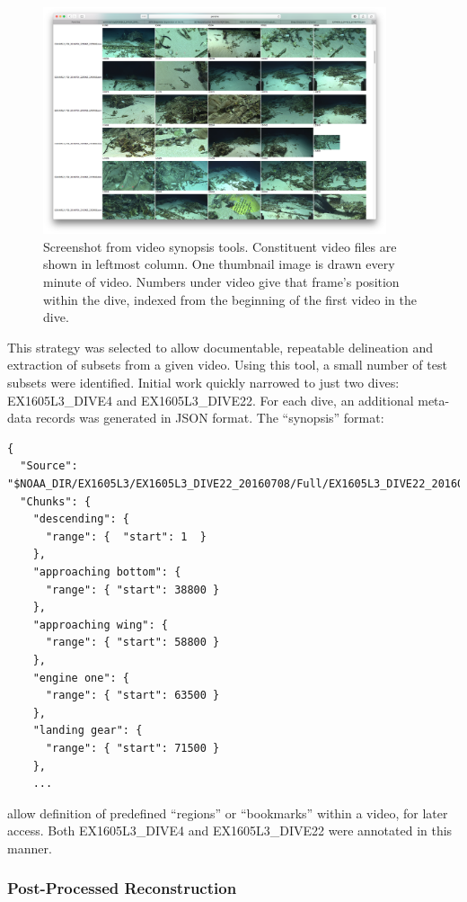 \documentclass[letterpaper,12pt]{article}
\begin{document}
\begin{figure}
    \centering
    \includegraphics[width=0.9\textwidth]{images/thumbnailer_screenshot.png}
    \caption{Screenshot from video synopsis tools.   Constituent video files are shown in leftmost column.   One thumbnail image is drawn every minute of video.  Numbers under video give that frame's position within the dive, indexed from the beginning of the first video in the dive.}
    \label{img:thumbnails}
\end{figure}

This strategy was selected to allow documentable, repeatable delineation and extraction of subsets from a given video.  Using this tool, a small number of test subsets were identified.   Initial work quickly narrowed to just two dives: EX1605L3\_DIVE4 and EX1605L3\_DIVE22.  For each dive, an additional meta-data records was generated in JSON format.  The ``synopsis'' format:

\begin{Verbatim}[fonstize=\small]
{
  "Source": "$NOAA_DIR/EX1605L3/EX1605L3_DIVE22_20160708/Full/EX1605L3_DIVE22_20160708.json",
  "Chunks": {
    "descending": {
      "range": {  "start": 1  }
    },
    "approaching bottom": {
      "range": { "start": 38800 }
    },
    "approaching wing": {
      "range": { "start": 58800 }
    },
    "engine one": {
      "range": { "start": 63500 }
    },
    "landing gear": {
      "range": { "start": 71500 }
    },
    ...
\end{Verbatim}

allow definition of predefined ``regions'' or ``bookmarks'' within a video, for later access.  Both EX1605L3\_DIVE4 and EX1605L3\_DIVE22 were annotated in this manner.



\subsubsection{Post-Processed Reconstruction}
\end{document}
